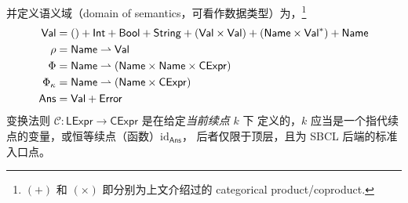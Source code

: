 并定义语义域（domain of semantics，可看作数据类型）为，\footnote{
  $(+)$ 和 $(\times)$ 即分别为上文介绍过的 categorical product/coproduct.
}
\endgroup
\begingroup
\setlength{\abovedisplayskip}{3pt}\setlength{\belowdisplayskip}{3pt}
\begin{equation}\label{eq:cps-sem-domain}
  \begin{aligned}
    \mathsf{Val} &= () + \mathsf{Int} + \mathsf{Bool} + \mathsf{String} + (\mathsf{Val} \times \mathsf{Val}) + (\mathsf{Name} \times \mathsf{Val}^*) + \mathsf{Name} \\
    \rho &= \mathsf{Name} \rightharpoonup \mathsf{Val} \\
    \Phi &= \mathsf{Name} \rightharpoonup (\mathsf{Name} \times \mathsf{Name} \times \mathsf{CExpr}) \\
    \Phi_\kappa &= \mathsf{Name} \rightharpoonup (\mathsf{Name} \times \mathsf{CExpr}) \\
    \mathsf{Ans} &= \mathsf{Val} + \mathsf{Error}
  \end{aligned}
\end{equation}
\endgroup
变换法则 $\mathcal{C} :  \mathsf{LExpr} \to \mathsf{CExpr}$ 是在给定\emph{当前续点} $k$ 下
定义的，$k$ 应当是一个指代续点的变量，或恒等续点（函数）$\mathrm{id}_\mathsf{Ans}$，
后者仅限于顶层，且为 SBCL 后端的标准入口点。

